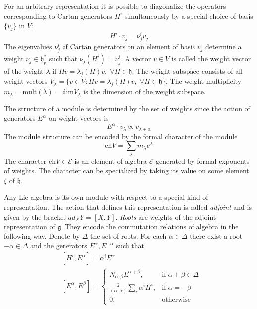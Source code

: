 \documentclass[preprint,12pt]{elsarticle}
\newcommand{\gf}{\mathfrak{g}}
\newcommand{\hf}{\mathfrak{h}}
\newcommand{\hfg}{\hf_{\gf}}
\begin{document}
For an arbitrary representation it is possible to diagonalize the operators corresponding to Cartan generators $H^{i}$ simultaneously by a special choice of basis $\{v_{j}\}$ in $V$:
\begin{equation}
  \label{eq:3}
  H^{i}\cdot v_{j}=\nu_{j}^{i}v_{j}
\end{equation}
The eigenvalues $\nu^{i}_{j}$ of Cartan generators on an element of basis $v_{j}$ determine a weight $\nu_{j}\in \hfg^{*}$ such that $\nu_{j}(H^{i})=\nu_{j}^{i}$. A vector $v\in V$ is called the weight vector of the weight $\lambda$ if $H v=\lambda_{j}(H)v,\; \forall H\in \hf$. The  weight subspace consists of all weight vectors $V_{\lambda}=\{v\in V: H v=\lambda_{j}(H)v,\; \forall H\in \hf\}$. The weight multiplicity $m_{\lambda}=\mathrm{mult}(\lambda)=\mathrm{dim} V_{\lambda}$ is the dimension of the weight subspace.

The structure of a module is determined by the set of weights since the action of generators $E^{\alpha}$ on weight vectors is
\begin{equation}
  \label{eq:5}
  E^{\alpha}\cdot v_{\lambda} \propto v_{\lambda+\alpha}
\end{equation}
The module structure can be encoded by the formal character of the module
\begin{equation}
  \label{eq:10}
  \mathrm{ch}V=\sum_{\lambda}m_{\lambda} e^{\lambda}
\end{equation}
The character  $\mathrm{ch}V\in \mathcal{E}$ is an element of algebra $\mathcal{E}$ generated by formal exponents of weights.
The character can be specialized by taking its value on some element $\xi$ of $\hf$.

Any Lie algebra is its own module with respect to a special kind of representation. The action that
defines this representation is called {\it adjoint} and is given by the bracket $ad_{X} Y=[X,Y]$. 
{\it Roots} are weights of the adjoint representation of $\gf$. They encode the commutation relations of algebra in the following way. Denote by $\Delta$ the set of roots. For each $\alpha\in \Delta$ there exist a root $-\alpha\in \Delta$ and the generators $E^{\alpha}, E^{-\alpha}$ such that
\begin{align}
  \label{eq:4}
  &  [H^{i},E^{\alpha}]=\alpha^{i}E^{\alpha} \\
  &\left[E^{\alpha},E^{\beta}\right]=
  \begin{cases}
    N_{\alpha,\beta} E^{\alpha+\beta}, & \mbox{if}\; \alpha+\beta\in \Delta\\
    \frac{2}{(\alpha,\alpha)} \sum_{i}\alpha^{i} H^{i},&  \mbox{if}\; \alpha=-\beta\\
    0,&\mbox{otherwise}
  \end{cases}
\end{align}
\end{document}

